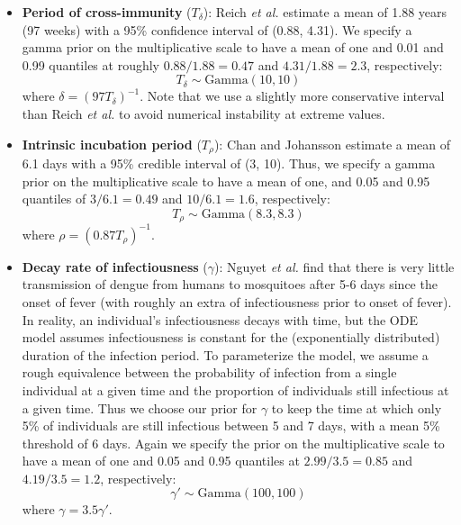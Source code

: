 \documentclass[12pt,letterpaper]{article}
\begin{document}
\begin{itemize}
\item \textbf{Period of cross-immunity} ($T_{\delta}$): Reich \emph{et al.} \cite{Reich2013} estimate a mean of 1.88 years (97 weeks) with a 95\% confidence interval of (0.88, 4.31).
We specify a gamma prior on the multiplicative scale to have a mean of one and 0.01 and 0.99 quantiles at roughly $0.88/1.88 = 0.47$ and $4.31/1.88 = 2.3$, respectively:
\begin{equation}
T_{\delta} \sim \text{Gamma}(10, 10)
\end{equation}
where $\delta = (97 T_\delta)^{-1}$.
Note that we use a slightly more conservative interval than Reich \emph{et al.} to avoid numerical instability at extreme values.
\\
\item \textbf{Intrinsic incubation period} ($T_{\rho}$): Chan and Johansson \cite{Chan2012} estimate a mean of 6.1 days with a 95\% credible interval of (3, 10).
Thus, we specify a gamma prior on the multiplicative scale to have a mean of one, and 0.05 and 0.95 quantiles of $3 / 6.1 = 0.49$ and $10 / 6.1 = 1.6$, respectively:
\begin{equation}
T_{\rho} \sim \text{Gamma}(8.3, 8.3)
\end{equation}
where $\rho = (0.87 T_{\rho})^{-1}$.
\\
\item \textbf{Decay rate of infectiousness} ($\gamma$): Nguyet \emph{et al.} \cite{Nguyet2013} find that there is very little transmission of dengue from humans to mosquitoes after 5-6 days since the onset of fever (with roughly an extra of infectiousness prior to onset of fever).
In reality, an individual's infectiousness decays with time, but the ODE model assumes infectiousness is constant for the (exponentially distributed) duration of the infection period.    
To parameterize the model, we assume a rough equivalence between the probability of infection from a single individual at a given time and the proportion of individuals still infectious at a given time.
Thus we choose our prior for $\gamma$ to keep the time at which only 5\% of individuals are still infectious between 5 and 7 days, with a mean 5\% threshold of 6 days.
Again we specify the prior on the multiplicative scale to have a mean of one and 0.05 and 0.95 quantiles at $2.99/3.5 = 0.85$ and $4.19 / 3.5 = 1.2$, respectively:
\begin{equation}
\gamma' \sim \text{Gamma}(100, 100)
\end{equation}
where $\gamma = 3.5\gamma'$.

\end{itemize}
\end{document}
